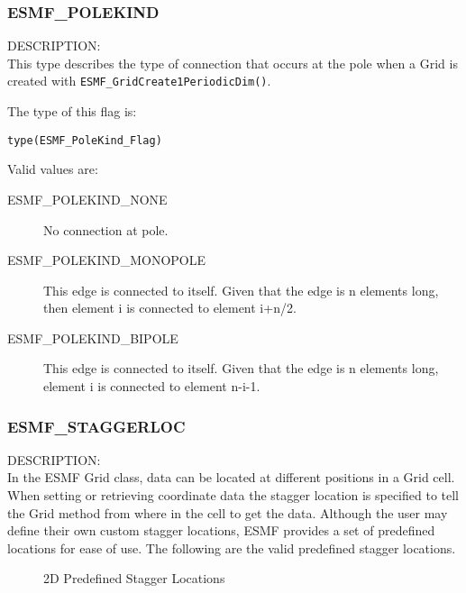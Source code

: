 \subsubsection{ESMF\_POLEKIND}
\label{sec:opt:polekind}

{\sf DESCRIPTION:\\}
This type describes the type of connection that occurs at the pole when a Grid is 
created with {\tt ESMF\_GridCreate1PeriodicDim()}.

The type of this flag is:

{\tt type(ESMF\_PoleKind\_Flag)}

Valid values are:
\begin{description}
\item [ESMF\_POLEKIND\_NONE] No connection at pole.

\item [ESMF\_POLEKIND\_MONOPOLE] This edge is connected to itself. Given
that the edge is n elements long, then element i is connected to
element i+n/2.

\item [ESMF\_POLEKIND\_BIPOLE] This edge is connected to itself. Given
that the edge is n elements long, element i is connected to element n-i-1.
\end{description}



\subsubsection{ESMF\_STAGGERLOC}
\label{sec:opt:staggerloc}

 {\sf DESCRIPTION:\\}
 In the ESMF Grid class, data can be located at different positions in a
 Grid cell.  When setting or retrieving coordinate data the stagger location is
 specified to tell the Grid method  from where in the cell to get the data. 
 Although the user may define their own custom stagger locations, 
 ESMF provides a set of predefined locations for ease of use. The
following are the valid predefined stagger locations. 

\medskip

\begin{center}
\begin{figure}
\center
{}
\caption{2D Predefined Stagger Locations}
\label{fig:gridstaggerloc2d}
\end{figure}
\end{center}

